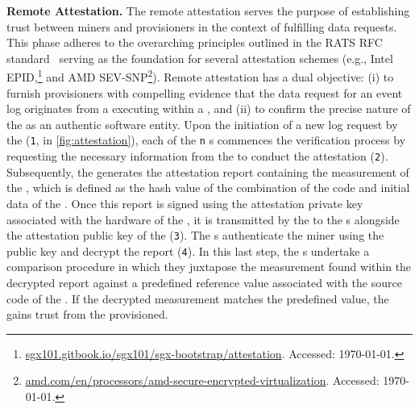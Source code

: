 \textbf{Remote Attestation.} The remote attestation serves the purpose of establishing trust between miners and provisioners in the context of fulfilling data requests. This phase adheres to the overarching principles outlined in the RATS RFC standard~\cite{rfc9334} serving as the foundation for several attestation schemes (e.g., Intel EPID,\footnote{\url{sgx101.gitbook.io/sgx101/sgx-bootstrap/attestation}. Accessed: \today.} and AMD SEV-SNP\footnote{\url{amd.com/en/processors/amd-secure-encrypted-virtualization}. Accessed: \today.}). Remote attestation has a dual objective: (i) to furnish provisioners with compelling evidence that the data request for an event log originates from a  executing within a , and (ii) to confirm the precise nature of the  as an authentic  software entity. Upon the initiation of a new log request by the  (\texttt{1}, in \cref{fig:attestation}), each of the \texttt{n} s commences the verification process by requesting the necessary information from the  to conduct the attestation (\texttt{2}). Subsequently, the  generates the attestation report containing the measurement of the , which is defined as the hash value of the combination of the code and initial data of the . Once this report is signed using the attestation private key associated with the hardware of the , it is transmitted by the  to the s alongside the attestation public key of the  (\texttt{3}). The s authenticate the miner using the public key and decrypt the report (\texttt{4}). In this last step, the s undertake a comparison procedure in which they juxtapose the measurement found within the decrypted report against a predefined reference value associated with the source code of the . If the decrypted measurement matches the predefined value, the  gains trust from the provisioned.


